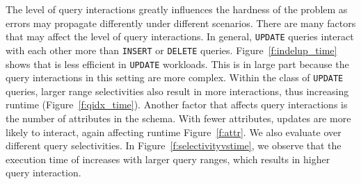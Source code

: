 The level of query interactions greatly influences the hardness of the problem
as errors may propagate differently under different scenarios. There are many
factors that may affect the level of query interactions. In general,
\texttt{UPDATE} queries interact with each other more than \texttt{INSERT} or
\texttt{DELETE} queries. Figure~\ref{f:indelup_time} shows that \sys is less
efficient in \texttt{UPDATE} workloads. This is in large part because the
query interactions in this setting are more complex. Within the class of
\texttt{UPDATE} queries, larger range selectivities also result in more
interactions, thus increasing runtime (Figure~\ref{f:qidx_time}). Another
factor that affects query interactions is the number of attributes in the
schema. With fewer attributes, updates are more likely to interact, again
affecting runtime Figure~\ref{f:attr}. We also evaluate \sys over different
query selectivities. In Figure~\ref{f:selectivityvstime}, we observe that the
execution time of \sys increases with larger query ranges, which results in
higher query interaction.



